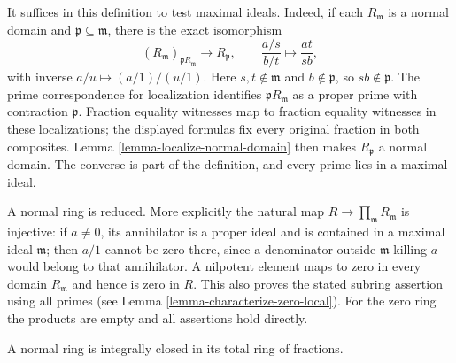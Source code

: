 \noindent
It suffices in this definition to test maximal ideals. Indeed,
if each $R_{\mathfrak m}$ is a normal domain and
$\mathfrak p\subseteq\mathfrak m$, there is the exact isomorphism
$$
(R_{\mathfrak m})_{\mathfrak pR_{\mathfrak m}}
\longrightarrow R_{\mathfrak p},\qquad
\frac{a/s}{b/t}\longmapsto\frac{at}{sb},
$$
with inverse $a/u\mapsto(a/1)/(u/1)$.
Here $s,t\notin\mathfrak m$ and $b\notin\mathfrak p$, so
$sb\notin\mathfrak p$. The prime correspondence for localization
identifies $\mathfrak pR_{\mathfrak m}$ as a proper prime with
contraction $\mathfrak p$. Fraction equality witnesses map to
fraction equality witnesses in these localizations; the displayed
formulas fix every original fraction in both composites.
Lemma \ref{lemma-localize-normal-domain} then makes
$R_{\mathfrak p}$ a normal domain. The converse is part of the
definition, and every prime lies in a maximal ideal.

A normal ring is reduced. More explicitly the natural map
$R\to\prod_{\mathfrak m}R_{\mathfrak m}$ is injective: if
$a\ne0$, its annihilator is a proper ideal and is contained in
a maximal ideal $\mathfrak m$; then $a/1$ cannot be zero there,
since a denominator outside $\mathfrak m$ killing $a$ would
belong to that annihilator. A nilpotent element maps to zero
in every domain $R_{\mathfrak m}$ and hence is zero in $R$.
This also proves the stated subring assertion using all primes
(see Lemma \ref{lemma-characterize-zero-local}).
For the zero ring the products are empty and all assertions
hold directly.

\begin{lemma}
\label{lemma-normal-ring-integrally-closed}
A normal ring is integrally closed in its total ring of fractions.
\end{lemma}

